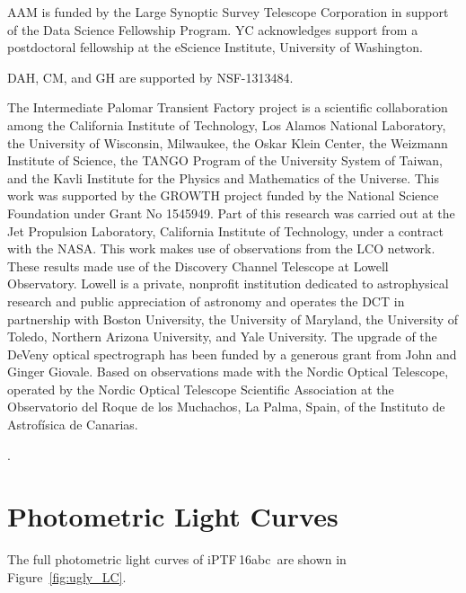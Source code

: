 \documentclass[twocolumn]{aastex61}
\newcommand{\abc}{iPTF\,16abc}
\begin{document}
AAM is funded by the Large Synoptic Survey Telescope Corporation in support
of the Data Science Fellowship Program. YC acknowledges support from a
postdoctoral fellowship at the eScience Institute, University of Washington.

DAH, CM, and GH are supported by NSF-1313484.

The Intermediate Palomar Transient Factory project is a scientific collaboration among the California Institute of Technology, Los Alamos National Laboratory, the University of Wisconsin, Milwaukee, the Oskar Klein Center, the Weizmann Institute of Science, the TANGO Program of the University System of Taiwan, and the Kavli Institute for the Physics and Mathematics of the Universe. This work was supported by the GROWTH project funded by the National Science Foundation under Grant No 1545949. Part of this research was carried out at the Jet Propulsion Laboratory, California Institute of Technology, under a contract with the NASA. This work makes use of observations from the LCO network. These results made use of the Discovery Channel Telescope at Lowell Observatory. Lowell is a private, nonprofit institution dedicated to astrophysical research and public appreciation of astronomy and operates the DCT in partnership with Boston University, the University of Maryland, the University of Toledo, Northern Arizona University, and Yale University. The upgrade of the DeVeny optical spectrograph has been funded by a generous grant from John and Ginger Giovale. Based on observations made with the Nordic Optical Telescope, operated by the Nordic Optical Telescope Scientific Association at the Observatorio del Roque de los Muchachos, La Palma, Spain, of the Instituto de Astrof\'isica de Canarias.


.


\appendix

\section{Photometric Light Curves}

The full photometric light curves of \abc\ are shown in Figure~\ref{fig:ugly_LC}.
\end{document}
